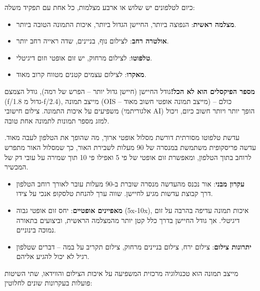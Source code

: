 
כיום לטלפונים יש שלוש או ארבע מצלמות, כל אחת עם תפקיד משלה:

\begin{itemize}
  \item \textbf{מצלמה ראשית}: הנפוצה ביותר, החיישן הגדול ביותר, איכות התמונה הטובה ביותר.
  \item \textbf{אולטרה רחב}: לצילום נוף, בניינים, שדה ראייה רחב יותר.
  \item \textbf{טלפוטו}: לצילום מרחוק, יש זום אופטי וזום דיגיטלי.
  \item \textbf{מאקרו}: לצילום עצמים קטנים מטווח קרוב מאוד.
\end{itemize}

\textbf{מספר הפיקסלים הוא לא הכל!}גודל החיישן (חיישן גדול יותר – הפרש של רמה), גודל הצמצם (f/1.8 גדול מ-f/2.4), מייצב תמונה (OIS – מייצב תמונה אופטי חשוב מאוד) – כולם משפיעים על איכות התמונה. צילום חישובי (אלגוריתמי AI) הופך יותר ויותר חשוב כיום, ויכול למזג מספר תמונות לתמונה אחת טובה.


עדשת טלפוטו מסורתית דורשת מסלול אופטי ארוך, מה שהופך את הטלפון לעבה מאוד. עדשה פריסקופית משתמשת במנסרה של 90 מעלות לשבירת האור, כך שמסלול האור מתפרש לרוחב בתוך הטלפון, ומאפשרת זום אופטי של פי 5 ואפילו פי 10 תוך שמירה על עובי דק של המכשיר.

\begin{itemize}
  \item \textbf{עקרון מבני}: אור נכנס מהעדשה מנסרה שוברת ב-90 מעלות עובר לאורך רוחב הטלפון דרך קבוצת עדשות מגיע לחיישן. שווה ערך להנחת טלסקופ אנכי על צידו.
  \item \textbf{מאפיינים אופטיים}: יחס זום אופטי גבוה (5x-10x), איכות תמונה עדיפה בהרבה על זום דיגיטלי. אך גודל החיישן בדרך כלל קטן יותר מהמצלמה הראשית, וביצועים בתאורה נמוכה בינוניים.
  \item \textbf{יתרונות צילום}: צילום ירח, צילום בניינים מרחוק, צילום תקריב על במה – דברים שטלפון רגיל לא יכול להגיע אליהם.
\end{itemize}


מייצב תמונה הוא טכנולוגיה מרכזית המשפיעה על איכות הצילום והווידאו, שתי השיטות פועלות בעקרונות שונים לחלוטין:

